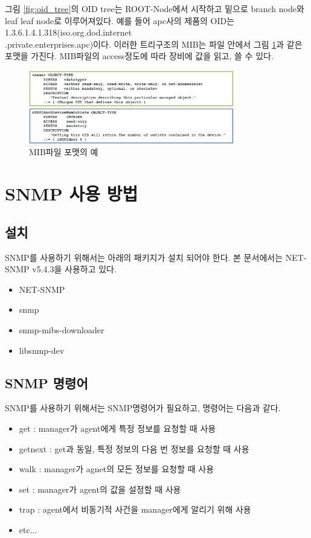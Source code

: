 \documentclass[11pt
  , a4paper
  , article
  , oneside
]{memoir}
\begin{document}
그림 \ref{fig:oid_tree}의 OID tree는 ROOT-Node에서 시작하고 밑으로 branch node와 leaf leaf node로 이루어져있다. 예를 들어 apc사의 제품의 OID는 1.3.6.1.4.1.318(iso.org.dod.internet\\.private.enterprises.apc)이다. 이러한 트리구조의 MIB는 파일 안에서 그림 \ref{fig:ex_mib}과 같은 포맷을 가진다. MIB파일의 access정도에 따라 장비에 값을 읽고, 쓸 수 있다.

\begin{figure}[h!]
  \centering
  \includegraphics[width=0.8\textwidth]{./images/ex_mib.eps}
  \caption{MIB파일 포맷의 예}
  \label{fig:ex_mib}   
\end{figure}

\chapter{SNMP 사용 방법}
\section{설치}
SNMP를 사용하기 위해서는 아래의 패키지가 설치 되어야 한다. 본 문서에서는 NET-SNMP\citep{net_snmp} v5.4.3을 사용하고 있다.
\begin{itemize}
\item NET-SNMP
\item snmp
\item snmp-mibs-downloader
\item libsnmp-dev
\end{itemize}


\section{SNMP 명령어}

SNMP를 사용하기 위해서는 SNMP명령어\citep{snmp_command}가 필요하고, 명령어는 다음과 같다.
\begin{itemize}
\item get : manager가 agent에게 특정 정보를 요청할 때 사용
\item getnext : get과 동일, 특정 정보의 다음 번 정보를 요청할 때 사용
\item walk : manager가 agnet의 모든 정보를 요청할 때 사용
\item set : manager가 agent의 값을 설정할 때 사용
\item trap : agent에서 비동기적 사건을 manager에게 알리기 위해 사용
\item etc...
\end{itemize}
\end{document}
